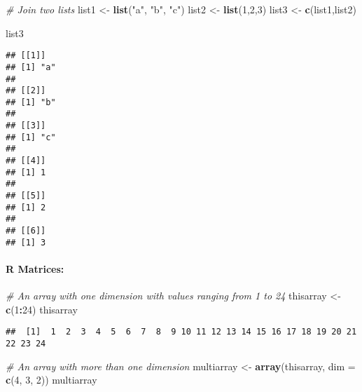 \documentclass[
]{article}
\newenvironment{Shaded}{\begin{snugshade}}{\end{snugshade}}
\newcommand{\AttributeTok}[1]{\textcolor[rgb]{0.13,0.29,0.53}{#1}}
\newcommand{\CommentTok}[1]{\textcolor[rgb]{0.56,0.35,0.01}{\textit{#1}}}
\newcommand{\DecValTok}[1]{\textcolor[rgb]{0.00,0.00,0.81}{#1}}
\newcommand{\FunctionTok}[1]{\textcolor[rgb]{0.13,0.29,0.53}{\textbf{#1}}}
\newcommand{\NormalTok}[1]{#1}
\newcommand{\OtherTok}[1]{\textcolor[rgb]{0.56,0.35,0.01}{#1}}
\newcommand{\SpecialCharTok}[1]{\textcolor[rgb]{0.81,0.36,0.00}{\textbf{#1}}}
\newcommand{\StringTok}[1]{\textcolor[rgb]{0.31,0.60,0.02}{#1}}
\begin{document}
\begin{Shaded}
\begin{Highlighting}[]
\CommentTok{\# Join two lists}
\NormalTok{list1 }\OtherTok{\textless{}{-}} \FunctionTok{list}\NormalTok{(}\StringTok{"a"}\NormalTok{, }\StringTok{"b"}\NormalTok{, }\StringTok{"c"}\NormalTok{)}
\NormalTok{list2 }\OtherTok{\textless{}{-}} \FunctionTok{list}\NormalTok{(}\DecValTok{1}\NormalTok{,}\DecValTok{2}\NormalTok{,}\DecValTok{3}\NormalTok{)}
\NormalTok{list3 }\OtherTok{\textless{}{-}} \FunctionTok{c}\NormalTok{(list1,list2)}

\NormalTok{list3}
\end{Highlighting}
\end{Shaded}

\begin{verbatim}
## [[1]]
## [1] "a"
## 
## [[2]]
## [1] "b"
## 
## [[3]]
## [1] "c"
## 
## [[4]]
## [1] 1
## 
## [[5]]
## [1] 2
## 
## [[6]]
## [1] 3
\end{verbatim}

\hypertarget{r-matrices-1}{%
\paragraph{R Matrices:}\label{r-matrices-1}}

\begin{Shaded}
\begin{Highlighting}[]
\CommentTok{\# An array with one dimension with values ranging from 1 to 24}
\NormalTok{thisarray }\OtherTok{\textless{}{-}} \FunctionTok{c}\NormalTok{(}\DecValTok{1}\SpecialCharTok{:}\DecValTok{24}\NormalTok{)}
\NormalTok{thisarray}
\end{Highlighting}
\end{Shaded}

\begin{verbatim}
##  [1]  1  2  3  4  5  6  7  8  9 10 11 12 13 14 15 16 17 18 19 20 21 22 23 24
\end{verbatim}

\begin{Shaded}
\begin{Highlighting}[]
\CommentTok{\# An array with more than one dimension}
\NormalTok{multiarray }\OtherTok{\textless{}{-}} \FunctionTok{array}\NormalTok{(thisarray, }\AttributeTok{dim =} \FunctionTok{c}\NormalTok{(}\DecValTok{4}\NormalTok{, }\DecValTok{3}\NormalTok{, }\DecValTok{2}\NormalTok{))}
\NormalTok{multiarray}
\end{Highlighting}
\end{Shaded}
\end{document}
